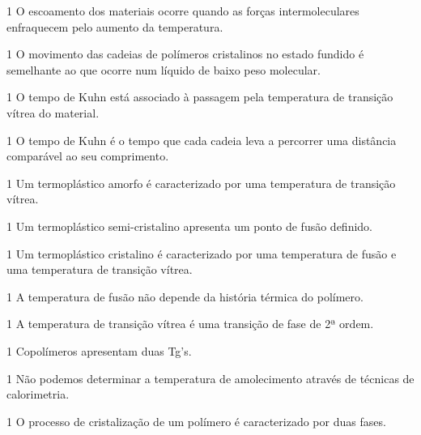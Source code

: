 \documentclass[\mainfilename]{subfiles}
\begin{document}
\begin{questionBox}1{ %
    O escoamento dos materiais ocorre quando as forças intermoleculares enfraquecem pelo aumento da temperatura.
} %
    \AT
\end{questionBox}
\begin{questionBox}1{ %
    O movimento das cadeias de polímeros cristalinos no estado fundido é semelhante ao que ocorre num líquido de baixo peso molecular.
} %
    \AF
\end{questionBox}
\begin{questionBox}1{ %
    O tempo de Kuhn está associado à passagem pela temperatura de transição vítrea do material.
} %
    \AT
\end{questionBox}
\begin{questionBox}1{ %
    O tempo de Kuhn é o tempo que cada cadeia leva a percorrer uma distância comparável ao seu comprimento.
} %
    \AT
\end{questionBox}
\begin{questionBox}1{ %
    Um termoplástico amorfo é caracterizado por uma temperatura de transição vítrea.
} %
    \AT
\end{questionBox}
\begin{questionBox}1{ %
    Um termoplástico semi-cristalino apresenta um ponto de fusão definido.
} %
    \AF
\end{questionBox}
\begin{questionBox}1{ %
    Um termoplástico cristalino é caracterizado por uma temperatura de fusão e uma temperatura de transição vítrea.
} %
    \AF
\end{questionBox}
\begin{questionBox}1{ %
    A temperatura de fusão não depende da história térmica do polímero.
} %
    \AF
\end{questionBox}
\begin{questionBox}1{ %
    A temperatura de transição vítrea é uma transição de fase de 2ª ordem. 
} %
    \AT
\end{questionBox}
\begin{questionBox}1{ %
    Copolímeros apresentam duas Tg's.
} %
    \AT
\end{questionBox}
\begin{questionBox}1{ %
    Não podemos determinar a temperatura de amolecimento através de técnicas de calorimetria.
} %
    \AT
\end{questionBox}
\begin{questionBox}1{ %
    O processo de cristalização de um polímero é caracterizado por duas fases.
} %
    \AT
\end{questionBox}
\end{document}
